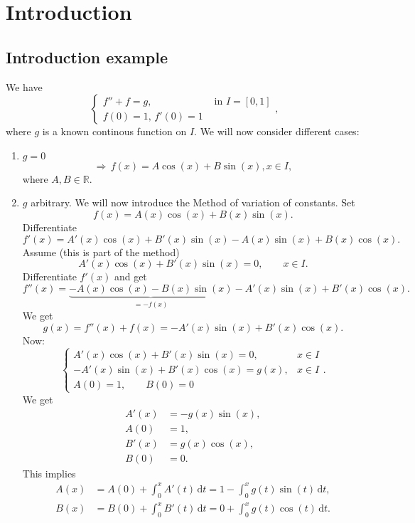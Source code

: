 
\section{Introduction}
\subsection{Introduction example} 
\label{sub:introduction_example}
We have
\[
	\begin{cases}
		f''+f =g, &\text{ in }I = [0,1]\\
		f(0)=1, \,f'(0)=1
	\end{cases},
\]
where $g$ is a known continous function on $I$. We will now consider different cases:

\begin{enumerate}[1.]
	\item $g=0$
	\[
		\Rightarrow \,f(x) = A \cos(x) + B \sin(x), x \in I,
	\]
	where $A,B \in \mathbb{R}$.
	\item $g$ arbitrary. We will now introduce the Method of variation of constants. Set
	\[
		f(x)=A(x) \cos(x)+ B(x) \sin(x).
	\]
	Differentiate
	\[
		f'(x) = A'(x) \cos(x) + B'(x) \sin(x) - A(x) \sin(x) + B(x) \cos(x).
	\]
	Assume (this is part of the method)
	\[
		A'(x)\cos(x) + B'(x) \sin(x) = 0, \qquad x \in I.
	\]
	Differentiate $f'(x)$ and get
	\[
		f''(x)=\underset{= -f(x)}{\underbrace{-A(x) \cos(x) - B(x) \sin(x)}} - A'(x) \sin(x) + B'(x) \cos(x).
	\]
	We get
	\[
		g(x) = f''(x)+f(x) = -A'(x) \sin(x) + B'(x) \cos(x).
	\]
	Now:
	\[
		\begin{cases}
			A'(x)\cos(x) + B'(x) \sin(x) = 0, & x \in I\\
			- A'(x) \sin(x)+ B'(x) \cos(x) = g(x), & x \in I \\
			A(0)=1, \qquad B(0)=0 &
		\end{cases}.
	\]
	We get
	\begin{align*}
		A'(x) &= - g(x)\sin(x), \\
		A(0) &= 1, \\
		B'(x) &= g(x) \cos(x), \\
		B(0) &=0.
	\end{align*}
	This implies
	\begin{align*}
		A(x) &= A(0) + \int_{0}^{x} A'(t) \,\mathrm{d}t = 1 - \int_{0}^{x} g(t) \sin(t) \,\mathrm{d}t, \\
		B(x) &= B(0) + \int_{0}^{x}B'(t) \,\mathrm{d}t = 0 + \int_{0}^{x}g(t)\cos(t) \,\mathrm{d}t.
	\end{align*}

\end{enumerate}
